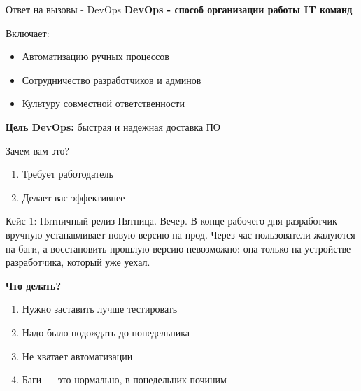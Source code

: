 \documentclass[aspectratio=169]{beamer}
\begin{document}
    \begin{frame}{Ответ на вызовы - DevOps}
        \textbf{DevOps - способ организации работы IT команд}

        Включает:
        \begin{itemize}
            \item Автоматизацию ручных процессов
            \item Сотрудничество разработчиков и админов
            \item Культуру совместной ответственности
        \end{itemize}

        \vspace{0.5cm}

        \textbf{Цель DevOps:} быстрая и надежная доставка ПО
    \end{frame}

    \begin{frame}{Зачем вам это?}
        \begin{enumerate}
            \item Требует работодатель
            \item Делает вас эффективнее
        \end{enumerate}
    \end{frame}

    \begin{frame}{Кейс 1: Пятничный релиз}
        Пятница. Вечер. В конце рабочего дня разработчик вручную устанавливает новую версию на прод. Через час пользователи жалуются
        на баги, а восстановить прошлую версию невозможно: она только на устройстве разработчика, который уже уехал.

        \vspace{0.5cm}

        \textbf{Что делать?}
        \begin{enumerate}
            \item Нужно заставить лучше тестировать
            \item Надо было подождать до понедельника
            \item Не хватает автоматизации
            \item Баги — это нормально, в понедельник починим
        \end{enumerate}
    \end{frame}
\end{document}
